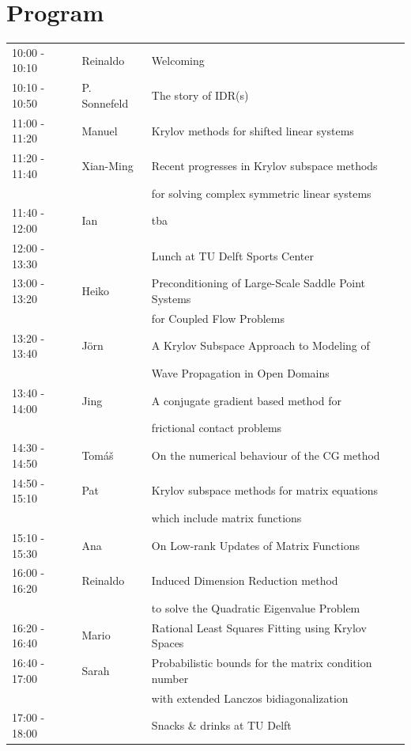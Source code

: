 \documentclass{article}
\begin{document}
\section*{Program}
\begin{table}[h]
\begin{tabular}{lll}
10:00 - 10:10 & Reinaldo & Welcoming \\
10:10 - 10:50 & P. Sonnefeld & The story of IDR(s) \\
\hline
11:00 - 11:20 & Manuel & Krylov methods for shifted linear systems \\
11:20 - 11:40 & Xian-Ming & Recent progresses in Krylov subspace methods\\
                        & & for solving complex symmetric linear systems\\
11:40 - 12:00 & Ian & tba\\
\hline
12:00 - 13:30 & & Lunch at TU Delft Sports Center \\
\hline
13:00 - 13:20 & Heiko & Preconditioning of Large-Scale Saddle Point Systems\\
                    & & for Coupled Flow Problems\\
13:20 - 13:40 & J\"orn & A Krylov Subspace Approach to Modeling of \\
                     & & Wave Propagation in Open Domains\\
13:40 - 14:00 & Jing & A conjugate gradient based method for \\
                   & & frictional contact problems\\
\hline
14:30 - 14:50 & Tom{\'a}{\v s} & On the numerical behaviour of the CG method\\
14:50 - 15:10 & Pat & Krylov subspace methods for matrix equations \\
                  & & which include matrix 
functions\\
15:10 - 15:30 & Ana & On Low-rank Updates of Matrix Functions\\
\hline
16:00 - 16:20 & Reinaldo & Induced Dimension Reduction method \\
            & & to solve the Quadratic Eigenvalue Problem \\
16:20 - 16:40 & Mario & Rational Least Squares Fitting using Krylov Spaces\\
16:40 - 17:00 & Sarah & Probabilistic bounds for the matrix condition number \\
                    & & with extended Lanczos bidiagonalization\\
\hline
17:00 - 18:00 & & Snacks \& drinks at TU Delft
\end{tabular}
\end{table}
\end{document}
